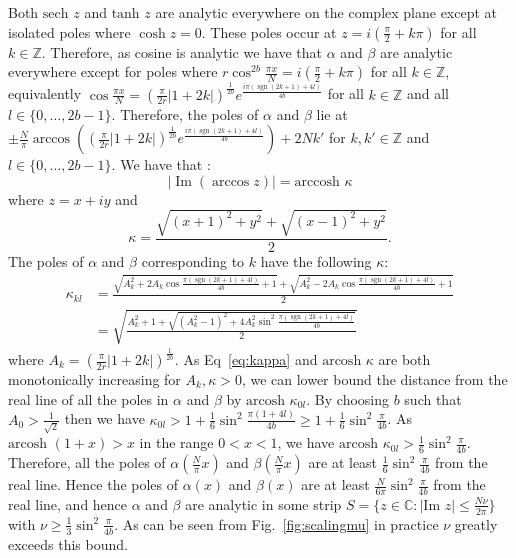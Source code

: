 \documentclass[aps,floatfix,10pt,amssymb,amsfont,amsmath,superscriptaddress,float,nofootinbib,longbibliography,nobalancelastpage,twocolumn]{revtex4-2}
\begin{document}
Both $\text{sech } z$ and $\text{tanh } z$ are analytic everywhere on the complex plane except at isolated poles where $\cosh z = 0$. These poles occur at $z = i(\frac{\pi}{2} + k \pi)$ for all $k \in \mathbb{Z}$. Therefore, as cosine is analytic we have that $\alpha$ and $\beta$ are analytic everywhere except for poles where $r \cos^{2b}\frac{\pi x}{N} = i(\frac{\pi}{2} + k \pi)$ for all $k \in \mathbb{Z}$, equivalently $\cos \frac{\pi x}{N} = (\frac{\pi}{2r}|1+2k|)^{\frac{1}{2b}} e^{\frac{i\pi(\operatorname{sgn}(2k+1)+4l)}{4b}}$  for all $k \in \mathbb{Z}$ and all $l \in \{0,\ldots,2b-1\}$. Therefore, the poles of $\alpha$ and $\beta$ lie at $\pm\frac{N}{\pi}\arccos ((\frac{\pi}{2r}|1+2k|)^{\frac{1}{2b}}e^{\frac{i\pi(\operatorname{sgn}(2k+1)+4l)}{4b}}) + 2N k'$ for $k, k' \in \mathbb{Z}$ and $l \in \{0,\ldots,2b-1\}$. We have that \cite[\href{http://dlmf.nist.gov/4.23.E35}{4.23.35}]{NIST:DLMF}:
\begin{equation}
    |\operatorname{Im}(\arccos z)| = \text{arccosh }{\kappa}
\end{equation}
where $z=x+iy$ and
\begin{equation}
    \kappa = \frac{\sqrt{(x+1)^2 + y^2} + \sqrt{(x-1)^2+y^2}}{2}.
\end{equation}
The poles of $\alpha$ and $\beta$ corresponding to $k$ have the following $\kappa$:
\begin{align}
    \kappa_{kl} &= \frac{\sqrt{A_k^2 + 2A_k\cos \frac{\pi(\operatorname{sgn}(2k+1)+4l)}{4b}+1} +\sqrt{A_k^2 - 2A_k\cos \frac{\pi(\operatorname{sgn}(2k+1)+4l)}{4b}+1}}{2}\\
    &= \sqrt{\frac{A_k^2+1 + \sqrt{(A_k^2-1)^2+4A_k^2\sin^2\frac{\pi(\operatorname{sgn}(2k+1)+4l)}{4b}}}{2}}
    \label{eq:kappa}
\end{align}
where $A_k = (\frac{\pi}{2r}|1+2k|)^{\frac{1}{2b}}$.  As Eq~\eqref{eq:kappa} and $\text{arcosh } \kappa$ are both monotonically increasing for $A_k, \kappa>0$, we can lower bound the distance from the real line of all the poles in $\alpha$ and $\beta$ by $\text{arcosh } \kappa_{0l}$. By choosing $b$ such that $A_0 > \frac{1}{\sqrt{2}}$ then we have $\kappa_{0l} > 1 + \frac{1}{6}\sin^2\frac{\pi(1+4l)}{4b} \geq 1 + \frac{1}{6}\sin^2\frac{\pi}{4b}$. As $\text{arcosh } (1+x) > x$ in the range $0<x<1$, we have $\text{arcosh } \kappa_{0l} > \frac{1}{6}\sin^2\frac{\pi}{4b}$. Therefore, all the poles of $\alpha(\frac{N}{\pi}x)$ and $\beta(\frac{N}{\pi}x)$ are at least $\frac{1}{6}\sin^2\frac{\pi}{4b}$ from the real line. Hence the poles of $\alpha(x)$ and $\beta(x)$ are at least $\frac{N}{6\pi}\sin^2\frac{\pi}{4b}$ from the real line, and hence $\alpha$ and $\beta$ are analytic in some strip $S =\{z \in \mathbb{C}: |\text{Im } z| \leq \frac{N\nu}{2\pi}\}$ with $\nu \geq \frac{1}{3}\sin^2\frac{\pi}{4b}$. As can be seen from Fig.~\ref{fig:scalingmu} in practice $\nu$ greatly exceeds this bound.
\end{document}
